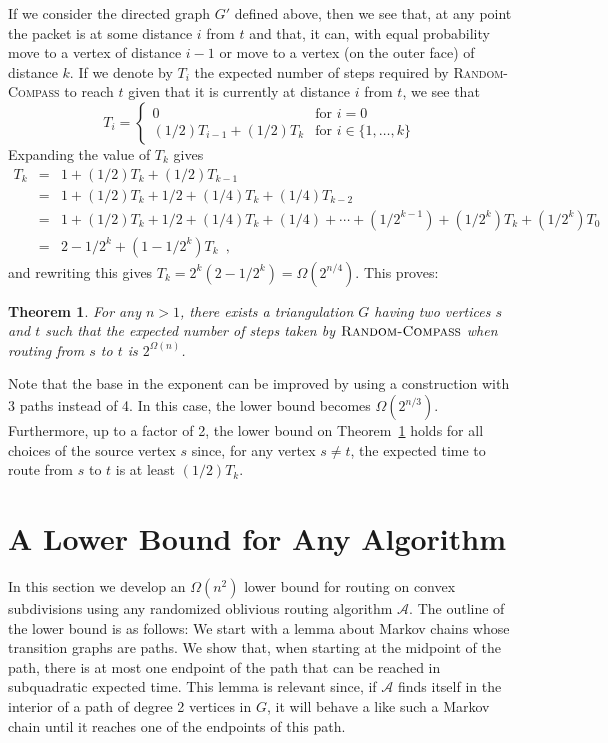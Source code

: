 \documentclass [letterpaper] {patmorin}
\newtheorem{theorem}{Theorem}%
\begin{document}
If we consider the directed graph $G'$ defined above, then we see that, at any point the packet is at some distance $i$ from $t$ and that, it can, with equal probability move to a vertex  of distance $i-1$ or move to a vertex (on the outer face) of distance $k$.  If we denote by $T_i$ the expected number of steps required by \textsc{Random-Compass} to reach $t$ given that it is currently at distance $i$ from $t$, we see that 
\[ 
  T_i = \left\{ \begin{array}{ll}
          0 & \mbox{for $i=0$} \\
          (1/2)T_{i-1} + (1/2)T_k & \mbox{for $i\in\{1,\ldots,k\}$} 
        \end{array}\right.
\]
Expanding the value of $T_k$ gives
\begin{eqnarray*}
  T_k & = & 1 + (1/2)T_k + (1/2)T_{k-1} \\
      & = & 1 + (1/2)T_k + 1/2 + (1/4)T_{k} + (1/4)T_{k-2} \\
      & = & 1 + (1/2)T_k + 1/2 + (1/4)T_{k} + (1/4)
              + \cdots  + (1/2^{k-1}) + (1/2^{k})T_{k} + (1/2^{k})T_0 \\
      & = & 2-1/2^{k} + (1-1/2^k)T_k \enspace ,
\end{eqnarray*}
and rewriting this gives $T_k = 2^k(2-1/2^{k}) = \Omega(2^{n/4})$.  This proves:

\begin{theorem}\label{theorem:random-compass}
For any $n>1$, there exists a triangulation $G$ having two vertices $s$ and $t$ such that the expected number of steps taken by $\textsc{Random-Compass}$ when routing from $s$ to $t$ is $2^{\Omega(n)}$.
\end{theorem}

Note that the base in the exponent can be improved by using a construction with 3 paths instead of 4.  In this case, the lower bound becomes $\Omega(2^{n/3})$.  Furthermore, up to a factor of 2, the lower bound on Theorem~\ref{theorem:random-compass} holds for all choices of the source vertex $s$ since, for any vertex $s\neq t$, the expected time to route from $s$ to $t$ is at least $(1/2)T_k$.

\section{A Lower Bound for Any Algorithm}

In this section we develop an $\Omega(n^2)$ lower bound for routing on convex subdivisions using any randomized oblivious routing algorithm $\mathcal{A}$.  The outline of the lower bound is as follows:  We start with a lemma about Markov chains whose transition graphs are paths. We show that, when starting at the midpoint of the path, there is at most one endpoint of the path that can be reached in subquadratic expected time.  This lemma is relevant since, if $\mathcal{A}$ finds itself in the interior of a path of degree 2 vertices in $G$, it will behave a like such a Markov chain until it reaches one of the endpoints of this path.
\end{document}
